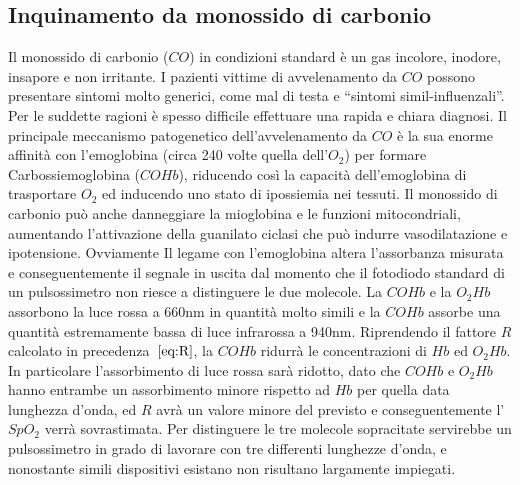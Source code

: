 \documentclass[a4paper, 12pt]{book}
\newcommand{\quotes}[1]{``#1''}
\begin{document}
\subsection{Inquinamento da monossido di carbonio}

Il monossido di carbonio ($CO$) in condizioni standard è un gas incolore, inodore, insapore e non irritante.
I pazienti vittime di avvelenamento da $CO$ possono presentare sintomi molto generici, come mal di testa e \quotes{sintomi simil-influenzali}.
Per le suddette ragioni è spesso difficile effettuare una rapida e chiara diagnosi.
Il principale meccanismo patogenetico dell'avvelenamento da $CO$ è la sua enorme affinità con l'emoglobina (circa 240 volte quella dell'$O_2$) per formare Carbossiemoglobina ($COHb$), riducendo così la capacità dell'emoglobina di trasportare $O_2$ ed inducendo uno stato di ipossiemia nei tessuti.
Il monossido di carbonio può anche danneggiare la mioglobina e le funzioni mitocondriali, aumentando l'attivazione della guanilato ciclasi che può indurre vasodilatazione e ipotensione.
Ovviamente Il legame con l'emoglobina altera l'assorbanza misurata e conseguentemente il segnale in uscita dal momento che il fotodiodo standard di un pulsossimetro non riesce a distinguere le due molecole.
La $COHb$ e la  $O_2Hb$ assorbono la luce rossa a 660nm in quantità molto simili e la $COHb$ assorbe una quantità estremamente bassa di luce infrarossa a 940nm.
Riprendendo il fattore $R$ calcolato in precedenza~$\ref{eq:R}$, la $COHb$ ridurrà le concentrazioni di $Hb$ ed $O_2Hb$.
In particolare l'assorbimento di luce rossa sarà ridotto, dato che $COHb$ e $O_2Hb$ hanno entrambe un assorbimento minore rispetto ad $Hb$ per quella data lunghezza d'onda, ed $R$ avrà un valore minore del previsto e conseguentemente l'$SpO_2$ verrà sovrastimata.
Per distinguere le tre molecole sopracitate servirebbe un pulsossimetro in grado di lavorare con tre differenti lunghezze d'onda, e nonostante simili dispositivi esistano non risultano largamente impiegati.
\end{document}

